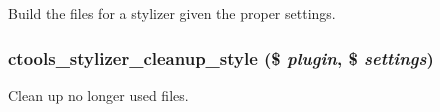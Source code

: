 \label{includes_2stylizer_8inc_a9bb576123a71e881578bece05f98bbcf}
Build the files for a stylizer given the proper settings. \hypertarget{includes_2stylizer_8inc_a2f95e8f0fa28bb411d149593c8fbe1e1}{
\subsubsection[{ctools\_\-stylizer\_\-cleanup\_\-style}]{\setlength{\rightskip}{0pt plus 5cm}ctools\_\-stylizer\_\-cleanup\_\-style (\$ {\em plugin}, \/  \$ {\em settings})}}
\label{includes_2stylizer_8inc_a2f95e8f0fa28bb411d149593c8fbe1e1}
Clean up no longer used files.

